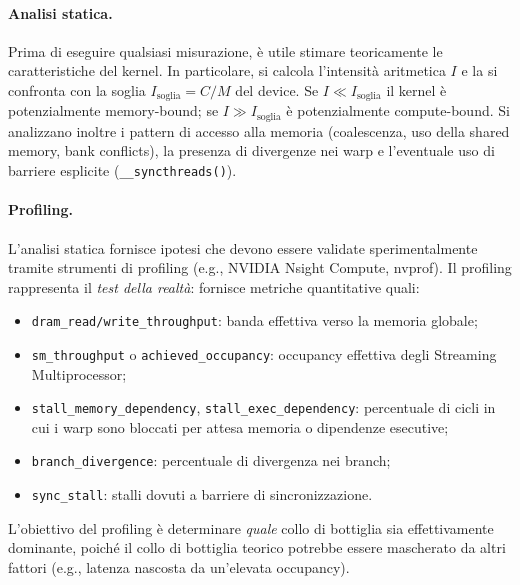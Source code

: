 \paragraph{Analisi statica.} Prima di eseguire qualsiasi misurazione, è utile stimare teoricamente le caratteristiche del kernel. In particolare, si calcola l'intensità aritmetica \(I\) e la si confronta con la soglia \(I_{\text{soglia}} = C/M\) del device. Se \(I \ll I_{\text{soglia}}\) il kernel è potenzialmente memory-bound; se \(I \gg I_{\text{soglia}}\) è potenzialmente compute-bound. Si analizzano inoltre i pattern di accesso alla memoria (coalescenza, uso della shared memory, bank conflicts), la presenza di divergenze nei warp e l'eventuale uso di barriere esplicite (\texttt{\_\_syncthreads()}).

\paragraph{Profiling.} L'analisi statica fornisce ipotesi che devono essere validate sperimentalmente tramite strumenti di profiling (e.g., NVIDIA Nsight Compute, nvprof). Il profiling rappresenta il \emph{test della realtà}: fornisce metriche quantitative quali:
\begin{itemize}
    \item \texttt{dram\_read/write\_throughput}: banda effettiva verso la memoria globale;
    \item \texttt{sm\_throughput} o \texttt{achieved\_occupancy}: occupancy effettiva degli Streaming Multiprocessor;
    \item \texttt{stall\_memory\_dependency}, \texttt{stall\_exec\_dependency}: percentuale di cicli in cui i warp sono bloccati per attesa memoria o dipendenze esecutive;
    \item \texttt{branch\_divergence}: percentuale di divergenza nei branch;
    \item \texttt{sync\_stall}: stalli dovuti a barriere di sincronizzazione.
\end{itemize}
L'obiettivo del profiling è determinare \emph{quale} collo di bottiglia sia effettivamente dominante, poiché il collo di bottiglia teorico potrebbe essere mascherato da altri fattori (e.g., latenza nascosta da un'elevata occupancy).

